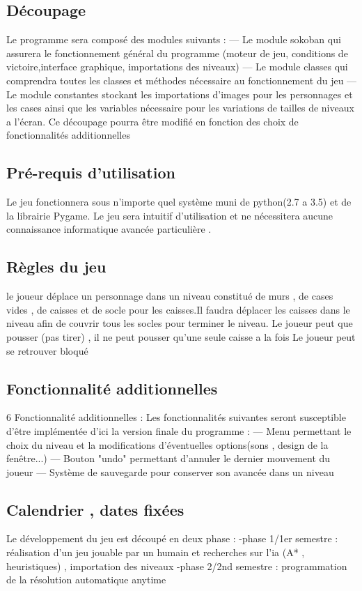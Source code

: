 \documentclass{article}
\begin{document}
		\subsection{Découpage}
		Le programme sera composé des modules suivants :
— Le module sokoban qui assurera le fonctionnement général du programme
(moteur de jeu, conditions de victoire,interface graphique, importations
des niveaux)
— Le module classes qui comprendra toutes les classes et méthodes nécessaire
au fonctionnement du jeu
— Le module constantes stockant les importations d’images pour les personnages
et les cases ainsi que les variables nécessaire pour les variations
de tailles de niveaux a l’écran.
Ce découpage pourra être modifié en fonction des choix de fonctionnalités additionnelles
		\subsection{Pré-requis d'utilisation}
		Le jeu fonctionnera sous n’importe quel système muni de python(2.7 a 3.5) et
de la librairie Pygame. Le jeu sera intuitif d’utilisation et ne nécessitera aucune
connaissance informatique avancée particulière .
		\subsection{Règles du jeu}
		le joueur déplace un personnage dans un niveau constitué de murs , de cases
vides , de caisses et de socle pour les caisses.Il faudra déplacer les caisses dans
le niveau afin de couvrir tous les socles pour terminer le niveau. Le joueur peut
que pousser (pas tirer) , il ne peut pousser qu’une seule caisse a la fois Le joueur
peut se retrouver bloqué
		\subsection{Fonctionnalité additionnelles}
			6 Fonctionnalité additionnelles :
Les fonctionnalités suivantes seront susceptible d’être implémentée d’ici la
version finale du programme :
— Menu permettant le choix du niveau et la modifications d’éventuelles
options(sons , design de la fenêtre...)
— Bouton "undo" permettant d’annuler le dernier mouvement du joueur
— Système de sauvegarde pour conserver son avancée dans un niveau
		\subsection{Calendrier , dates fixées}
		Le développement du jeu est découpé en deux phase :
-phase 1/1er semestre : réalisation d’un jeu jouable par un humain et recherches
sur l’ia (A* , heuristiques) , importation des niveaux
-phase 2/2nd semestre : programmation de la résolution automatique anytime
\end{document}
